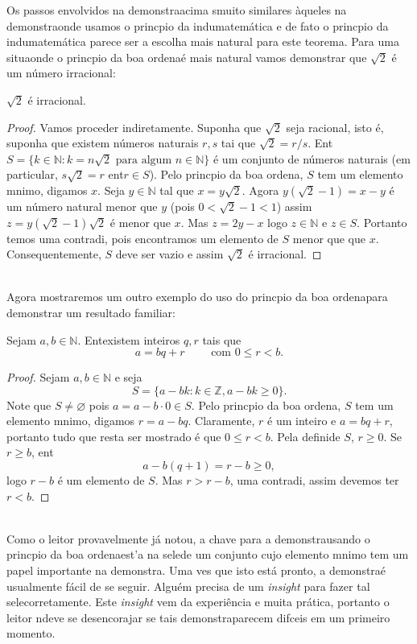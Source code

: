 Os passos envolvidos na demonstra\cao acima s\ao muito similares \`aqueles na demonstra\cao onde usamos o princ\ih pio da indu\cao matem\'atica e de fato o princ\ih pio da indu\cao matem\'atica parece ser a escolha mais natural para este teorema. Para uma situa\cao onde o princ\ih pio da boa ordena\cao \'e mais natural vamos demonstrar que $\sqrt{2}$ \'e um n\'umero irracional:
\begin{teob}\label{indteo4}
$\sqrt{2}$ \'e irracional.
\end{teob}
\begin{proof}
Vamos proceder indiretamente. Suponha que $\sqrt{2}$ seja racional, isto \'e, suponha que existem n\'umeros naturais $r,s$ tai que $\sqrt{2}=r/s$. Ent\ao $S=\{k\in\mathbb{N}: k=n\sqrt{2} \textrm{ para algum } n\in\mathbb{N}\}$ \'e um conjunto de n\'umeros naturais (em particular, $s\sqrt{2}=r$ ent\ao $r\in S$). Pelo princ\ih pio da boa ordena\caoi, $S$ tem um elemento m\ih nimo, digamos $x$. Seja $y\in\mathbb{N}$ tal que $x=y\sqrt{2}$. Agora $y(\sqrt{2}-1)=x-y$ \'e um n\'umero natural menor que $y$ (pois $0<\sqrt{2}-1<1$) assim $z=y(\sqrt{2}-1)\sqrt{2}$ \'e menor que $x$. Mas $z=2y-x$ logo $z\in\mathbb{N}$ e $z\in S$. Portanto temos uma contradi\caoi, pois encontramos um elemento de $S$ menor que que $x$. Consequentemente, $S$ deve ser vazio e assim $\sqrt{2}$ \'e irracional.
\end{proof}
\\

Agora mostraremos um outro exemplo do uso do princ\ih pio da boa ordena\cao para demonstrar um resultado familiar:
\begin{teob}\label{indteo5}
Sejam $a,b\in\mathbb{N}$. Ent\ao existem inteiros $q,r$ tais que
\[
a=bq+r \quad\quad\textrm{ com } 0\leq r<b.
\]
\end{teob}
\begin{proof}
Sejam $a,b\in\mathbb{N}$ e seja
\[
S=\{a-bk: k\in\mathbb{Z}, a-bk\geq 0\}.
\]
Note que $S\neq\varnothing$ pois $a=a-b\cdot 0\in S$. Pelo princ\ih pio da boa ordena\cao, $S$ tem um elemento m\ih nimo, digamos $r=a-bq$. Claramente, $r$ \'e um inteiro e $a=bq+r$, portanto tudo que resta ser mostrado \'e que $0\leq r<b$. Pela defini\cao de $S$, $r\geq 0$. Se $r\geq b$, ent\ao
\[
a-b(q+1)=r-b\geq 0,
\]
logo $r-b$ \'e um elemento de $S$. Mas $r>r-b$, uma contradi\caoi, assim devemos ter $r<b$.
\end{proof}
\\

Como o leitor provavelmente j\'a notou, a chave para a demonstra\cao usando o princ\ih pio da boa ordena\cao est'a na sele\cao de um conjunto cujo elemento m\ih nimo tem um papel importante na demonstra\caoi. Uma ves que isto est\'a pronto, a demonstra\cao \'e usualmente f\'acil de se seguir. Algu\'em precisa de um {\it insight} para fazer tal sele\cao corretamente. Este {\it insight} vem da experi\^encia e muita pr\'atica, portanto o leitor n\ao deve se desencorajar se tais demonstra\coes parecem dif\ih ceis em um primeiro momento.

